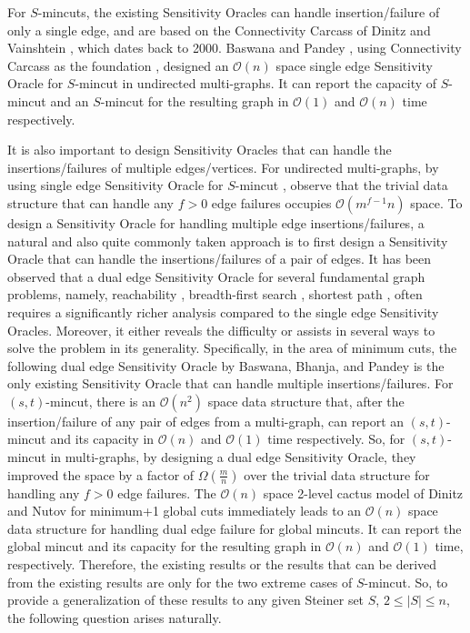 \documentclass[letterpaper,11pt]{article}
\begin{document}
For $S$-mincuts, the existing Sensitivity Oracles can handle insertion/failure of only a single edge, and are based on the Connectivity Carcass of Dinitz and Vainshtein \cite{DBLP:conf/stoc/DinitzV94, DBLP:conf/soda/DinitzV95, DBLP:journals/siamcomp/DinitzV00}, which dates back to 2000. Baswana and Pandey \cite{DBLP:conf/soda/BaswanaP22}, using Connectivity Carcass as the foundation \cite{DBLP:conf/stoc/DinitzV94, DBLP:conf/soda/DinitzV95, DBLP:journals/siamcomp/DinitzV00}, designed an ${\mathcal O}(n)$ space single edge Sensitivity Oracle for $S$-mincut in undirected multi-graphs. It can report the capacity of $S$-mincut and an $S$-mincut for the resulting graph in ${\mathcal O}(1)$ and ${\mathcal O}(n)$ time respectively. 

It is also important to design Sensitivity Oracles that can handle the insertions/failures of multiple edges/vertices. For undirected multi-graphs, by using single edge Sensitivity Oracle for $S$-mincut \cite{DBLP:conf/soda/BaswanaP22}, observe that the trivial data structure that can handle any $f>0$ edge failures occupies ${\mathcal O}(m^{f-1}n)$ space. To design a Sensitivity Oracle for handling multiple edge insertions/failures, a natural and also quite commonly taken approach is to first design a Sensitivity Oracle that can handle the insertions/failures of a pair of edges. It has been observed that a dual edge Sensitivity Oracle for several fundamental graph problems, namely, reachability \cite{DBLP:conf/icalp/Choudhary16, DBLP:conf/icalp/ChakrabortyCC22}, breadth-first search \cite{DBLP:conf/podc/Parter15, DBLP:conf/icalp/GuptaK17}, shortest path \cite{DBLP:conf/soda/DuanP09a}, 
often requires a significantly richer analysis compared to the single edge Sensitivity Oracles. Moreover, it either reveals the difficulty or assists in several ways to solve the problem in its generality.
Specifically, in the area of minimum cuts, the following dual edge Sensitivity Oracle by Baswana, Bhanja, and Pandey \cite{DBLP:journals/talg/BaswanaBP23} is the only existing Sensitivity Oracle that can handle multiple insertions/failures. For $(s,t)$-mincut, there is an ${\mathcal O}(n^2)$ space data structure that, after the insertion/failure of any pair of edges from a multi-graph, can report an $(s,t)$-mincut and its capacity in ${\mathcal O}(n)$ and ${\mathcal O}(1)$ time respectively.  So, for $(s,t)$-mincut in multi-graphs, by designing a dual edge Sensitivity Oracle, they improved the space by a factor of $\Omega(\frac{m}{n})$ over the trivial data structure for handling any $f>0$ edge failures. The ${\mathcal O}(n)$ space 2-level cactus model of Dinitz and Nutov \cite{DBLP:conf/stoc/DinitzN95} for minimum+1 global cuts immediately leads to an ${\mathcal O}(n)$ space data structure for handling dual edge failure for global mincuts. It can report the global mincut and its capacity for the resulting graph in ${\mathcal O}(n)$ and ${\mathcal O}(1)$ time, respectively. Therefore, the existing results or the results that can be derived from the existing results are only for the two extreme cases of $S$-mincut. So, to provide a generalization of these results to any given Steiner set $S$, $2\le |S| \le n$, the following question arises naturally.
\end{document}
